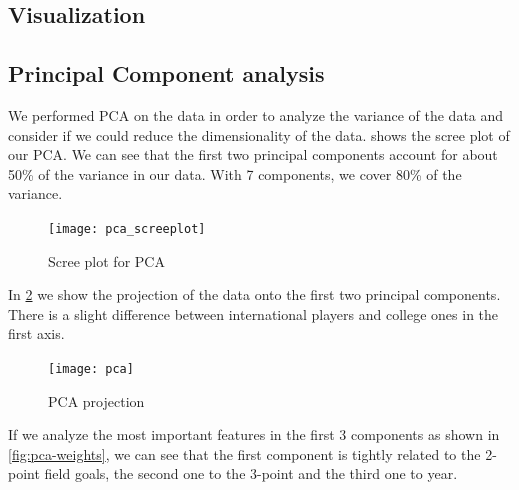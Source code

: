 \subsection{Visualization}%
\label{sub:visualization}

\subsection{Principal Component analysis}%
\label{sub:pca}

We performed PCA on the data in order to analyze the variance of the data and
consider if we could reduce the dimensionality of the data. 
shows the scree plot of our PCA. We can see that the first two principal
components account for about 50\% of the variance in our data. With 7
components, we cover 80\% of the variance.

\begin{figure}[H]
  \texttt{[image: pca\_screeplot]}
  \caption{Scree plot for PCA}%
  \label{fig:pca-scree}
\end{figure}

In \cref{fig:pca} we show the projection of the data onto the first two principal
components. There is a slight difference between international players and college ones
in the first axis.

\begin{figure}[H]
  \texttt{[image: pca]}
  \caption{PCA projection}%
  \label{fig:pca}
\end{figure}

If we analyze the most important features in the first 3 components as shown in
\cref{fig:pca-weights}, we can see that the first component is tightly related
to the 2-point field goals, the second one to the 3-point and the third one to
year.


